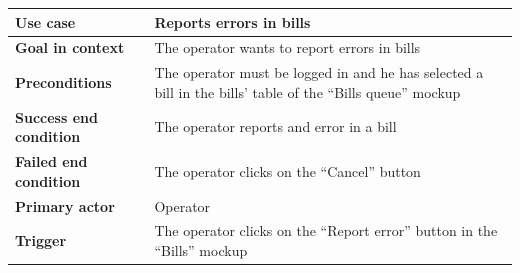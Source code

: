 {{{			\begin{table}[h]
			\begin{tabular}{|p{4cm}|p{10cm}|}
			\hline
				\centering \vspace{1mm} \bfseries{Use case} \vspace{1mm} & 
				\vspace{1mm} Reports errors in bills \vspace{1mm}\\
			\hline
				\centering \vspace{1mm} \bfseries{Goal in context} \vspace{1mm} & 
				\vspace{1mm} The operator wants to report errors in bills  \vspace{1mm}\\
			\hline
				\centering \vspace{1mm} \bfseries{Preconditions} \vspace{1mm} & 
				\vspace{1mm} The operator must be logged in and he has selected a bill in the bills’ table of the “Bills queue” mockup \vspace{1mm}\\
			\hline
				\centering \vspace{1mm} \bfseries{Success end condition} \vspace{1mm} & 
				\vspace{1mm} The operator reports and error in a bill \vspace{1mm}\\
			\hline
				\centering \vspace{1mm} \bfseries{Failed end condition} \vspace{1mm} & 
				\vspace{1mm} The operator clicks on the “Cancel” button \vspace{1mm}\\
			\hline
				\centering \vspace{1mm} \bfseries{Primary actor} \vspace{1mm} & 
				\vspace{1mm} Operator \vspace{1mm}\\
			\hline
				\centering \vspace{1mm} \bfseries{Trigger} \vspace{1mm} & 
				\vspace{1mm} The operator clicks on the “Report error” button in the “Bills”  mockup \vspace{1mm}\\
			\hline
			\end{tabular}
			\end{table}

}}}

